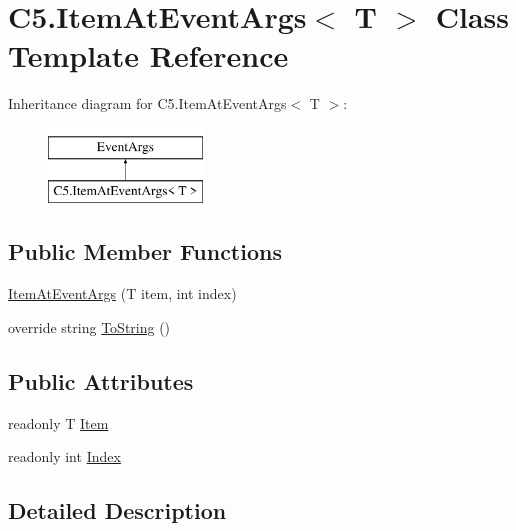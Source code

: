 \hypertarget{class_c5_1_1_item_at_event_args}{}\section{C5.\+Item\+At\+Event\+Args$<$ T $>$ Class Template Reference}
\label{class_c5_1_1_item_at_event_args}


 


Inheritance diagram for C5.\+Item\+At\+Event\+Args$<$ T $>$\+:\begin{figure}[H]
\begin{center}
\leavevmode
\includegraphics[height=2.000000cm]{class_c5_1_1_item_at_event_args}
\end{center}
\end{figure}
\subsection*{Public Member Functions}
\begin{DoxyCompactItemize}
\item 
\hyperlink{class_c5_1_1_item_at_event_args_aa8681d39e08259b380dc936047e0d2a3}{Item\+At\+Event\+Args} (T item, int index)
\item 
override string \hyperlink{class_c5_1_1_item_at_event_args_a70f0d39f1b79e032e371d6787e3e7832}{To\+String} ()
\end{DoxyCompactItemize}
\subsection*{Public Attributes}
\begin{DoxyCompactItemize}
\item 
readonly T \hyperlink{class_c5_1_1_item_at_event_args_ac031819eac1e4dd6b870ec19ab0ad537}{Item}
\item 
readonly int \hyperlink{class_c5_1_1_item_at_event_args_a6e28d2322e9f3a0b938763edf392a5d6}{Index}
\end{DoxyCompactItemize}


\subsection{Detailed Description}



